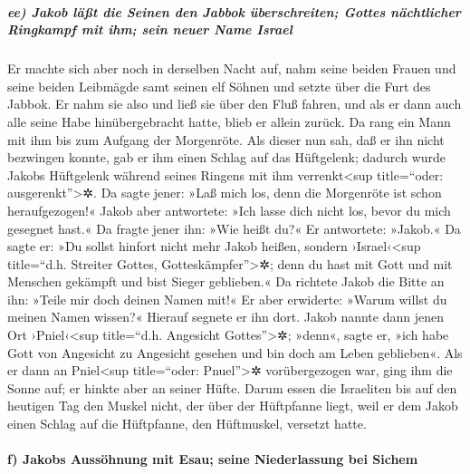 \hypertarget{ee-jakob-luxe4uxdft-die-seinen-den-jabbok-uxfcberschreiten-gottes-nuxe4chtlicher-ringkampf-mit-ihm-sein-neuer-name-israel}{%
\subparagraph{ee) Jakob läßt die Seinen den Jabbok überschreiten; Gottes
nächtlicher Ringkampf mit ihm; sein neuer Name
Israel}\label{ee-jakob-luxe4uxdft-die-seinen-den-jabbok-uxfcberschreiten-gottes-nuxe4chtlicher-ringkampf-mit-ihm-sein-neuer-name-israel}}

 Er machte sich aber noch in derselben Nacht auf, nahm
seine beiden Frauen und seine beiden Leibmägde samt seinen elf Söhnen
und setzte über die Furt des Jabbok.  Er nahm sie also
und ließ sie über den Fluß fahren, und als er dann auch alle seine Habe
hinübergebracht hatte,  blieb er allein zurück. Da rang
ein Mann mit ihm bis zum Aufgang der Morgenröte.  Als
dieser nun sah, daß er ihn nicht bezwingen konnte, gab er ihm einen
Schlag auf das Hüftgelenk; dadurch wurde Jakobs Hüftgelenk während
seines Ringens mit ihm verrenkt\textless sup title=``oder:
ausgerenkt''\textgreater✲.  Da sagte jener: »Laß mich
los, denn die Morgenröte ist schon heraufgezogen!« Jakob aber
antwortete: »Ich lasse dich nicht los, bevor du mich gesegnet hast.«
 Da fragte jener ihn: »Wie heißt du?« Er antwortete:
»Jakob.«  Da sagte er: »Du sollst hinfort nicht mehr
Jakob heißen, sondern ›Israel‹\textless sup title=``d.h. Streiter
Gottes, Gotteskämpfer''\textgreater✲; denn du hast mit Gott und mit
Menschen gekämpft und bist Sieger geblieben.«  Da
richtete Jakob die Bitte an ihn: »Teile mir doch deinen Namen mit!« Er
aber erwiderte: »Warum willst du meinen Namen wissen?« Hierauf segnete
er ihn dort.  Jakob nannte dann jenen Ort
›Pniel‹\textless sup title=``d.h. Angesicht Gottes''\textgreater✲;
»denn«, sagte er, »ich habe Gott von Angesicht zu Angesicht gesehen und
bin doch am Leben geblieben«.  Als er dann an
Pniel\textless sup title=``oder: Pnuel''\textgreater✲ vorübergezogen
war, ging ihm die Sonne auf; er hinkte aber an seiner Hüfte.
 Darum essen die Israeliten bis auf den heutigen Tag den
Muskel nicht, der über der Hüftpfanne liegt, weil er dem Jakob einen
Schlag auf die Hüftpfanne, den Hüftmuskel, versetzt hatte.

\hypertarget{f-jakobs-aussuxf6hnung-mit-esau-seine-niederlassung-bei-sichem}{%
\paragraph{f) Jakobs Aussöhnung mit Esau; seine Niederlassung bei
Sichem}\label{f-jakobs-aussuxf6hnung-mit-esau-seine-niederlassung-bei-sichem}}

